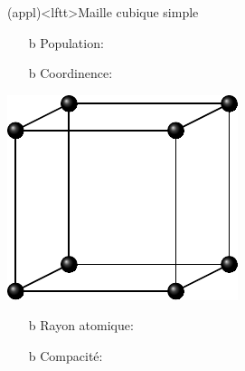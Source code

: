 \documentclass[../../main/main.tex]{subfiles}
\begin{document}
\begin{tcb*}[breakable](appl)<lftt>{Maille cubique simple}
	\noindent
	\begin{minipage}[t]{.75\linewidth}
		\begin{itemize}
			\item[b]{Population}: %
			\vspace{-15pt}
			\item[b]{Coordinence}: 
		\end{itemize}
	\end{minipage}
	\hfill
	\begin{minipage}[t]{.20\linewidth}
		\vspace{0pt}
		\begin{center}
			\includegraphics[width=\linewidth]{maille_CS}
		\end{center}
	\end{minipage}
	\begin{itemize}
		\item[b]{Rayon atomique}: %
		\vspace{-15pt}
		\item[b]{Compacité}:
		\leavevmode\vspace*{-25pt}\relax
		\psw{%
			\begin{gather*}

\end{gather*}}
\end{itemize}
\end{tcb*}
\end{document}
